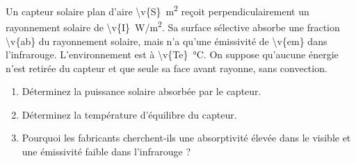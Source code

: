 Un capteur solaire plan d'aire \qty{\v{S}}{m^2} reçoit perpendiculairement un rayonnement solaire de \qty{\v{I}}{W/m^2}. Sa surface sélective absorbe une fraction \num{\v{ab}} du rayonnement solaire, mais n'a qu'une émissivité de \num{\v{em}} dans l'infrarouge. L'environnement est à \qty{\v{Te}}{\degreeCelsius}. On suppose qu'aucune énergie n'est retirée du capteur et que seule sa face avant rayonne, sans convection.

\begin{enumerate}[label=\alph*)]
    \item Déterminez la puissance solaire absorbée par le capteur.
    \item Déterminez la température d'équilibre du capteur.
    \item Pourquoi les fabricants cherchent-ils une absorptivité élevée dans le visible et une émissivité faible dans l'infrarouge ?
\end{enumerate}
